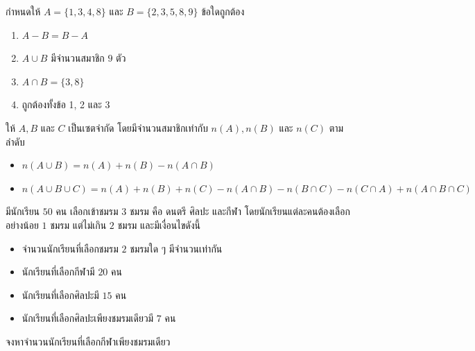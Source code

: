 \newpage
\begin{examplebox}
กำหนดให้ $A=\{1,3,4,8\}$ และ $B=\{2,3,5,8,9\}$  
ข้อใดถูกต้อง
\begin{enumerate}
\item $A-B=B-A$
\item $A \cup B$ มีจำนวนสมาชิก $9$ ตัว
\item $A \cap B=\{3,8\}$
\item ถูกต้องทั้งข้อ 1, 2 และ 3
\end{enumerate}
\end{examplebox}

\newpage
\begin{remarkbox}
ให้ $A,B$ และ $C$ เป็นเซตจำกัด โดยมีจำนวนสมาชิกเท่ากับ $n(A), n(B)$ และ $n(C)$ ตามลำดับ
\begin{itemize}
\item $n(A\cup B)=n(A)+n(B)-n(A\cap B)$
\item $n(A\cup B\cup C)=n(A)+n(B)+n(C)-n(A\cap B)-n(B\cap C)-n(C\cap A)+n(A\cap B\cap C)$
\end{itemize}
\end{remarkbox}


\begin{examplebox}
มีนักเรียน $50$ คน เลือกเข้าชมรม $3$ ชมรม คือ ดนตรี ศิลปะ และกีฬา  
โดยนักเรียนแต่ละคนต้องเลือกอย่างน้อย $1$ ชมรม แต่ไม่เกิน $2$ ชมรม และมีเงื่อนไขดังนี้
\begin{itemize}
\item จำนวนนักเรียนที่เลือกชมรม $2$ ชมรมใด ๆ มีจำนวนเท่ากัน
\item นักเรียนที่เลือกกีฬามี $20$ คน
\item นักเรียนที่เลือกศิลปะมี $15$ คน
\item นักเรียนที่เลือกศิลปะเพียงชมรมเดียวมี $7$ คน
\end{itemize}
จงหาจำนวนนักเรียนที่เลือกกีฬาเพียงชมรมเดียว
\end{examplebox}
